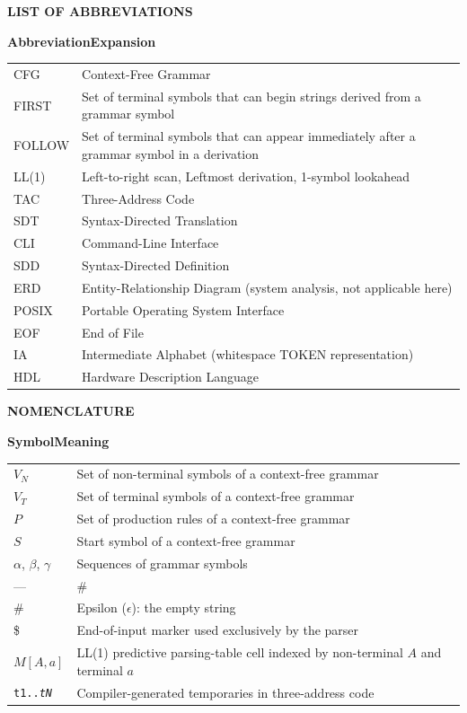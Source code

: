 \documentclass[12pt,a4paper,oneside,openany]{report}
\newcommand{\pmpage}[1]{%
  \clearpage\thispagestyle{fancy}%
  \begin{center}\bfseries\fontsize{14}{18}\selectfont #1\end{center}%
  \vspace{0.6em}}
\begin{document}
\pmpage{LIST OF ABBREVIATIONS}
{\bfseries\fontsize{12}{18}\selectfont Abbreviation\hfill Expansion\par}
\vspace{0.4em}\noindent
\begin{tabular}{@{}p{3.6cm}p{10.3cm}@{}}
CFG & Context-Free Grammar \\
FIRST & Set of terminal symbols that can begin strings derived from a grammar symbol \\
FOLLOW & Set of terminal symbols that can appear immediately after a grammar symbol in a derivation \\
LL(1) & Left-to-right scan, Leftmost derivation, 1-symbol lookahead \\
TAC & Three-Address Code \\
SDT & Syntax-Directed Translation \\
CLI & Command-Line Interface \\
SDD & Syntax-Directed Definition \\
ERD & Entity-Relationship Diagram (system analysis, not applicable here) \\
POSIX & Portable Operating System Interface \\
EOF & End of File \\
IA & Intermediate Alphabet (whitespace TOKEN representation) \\
HDL & Hardware Description Language \\
\end{tabular}

\pmpage{NOMENCLATURE}
{\bfseries\fontsize{12}{18}\selectfont Symbol\hfill Meaning\par}
\vspace{0.4em}\noindent
\begin{tabular}{@{}p{2.7cm}p{11.2cm}@{}}
$V_N$ & Set of non-terminal symbols of a context-free grammar \\
$V_T$ & Set of terminal symbols of a context-free grammar \\
$P$ & Set of production rules of a context-free grammar \\
$S$ & Start symbol of a context-free grammar \\
$\alpha$, $\beta$, $\gamma$ & Sequences of grammar symbols \\
--- & \# \\ 
\# & Epsilon ($\epsilon$): the empty string \\
\$ & End-of-input marker used exclusively by the parser \\
$M[A,a]$ & LL(1) predictive parsing-table cell indexed by non-terminal $A$ and terminal $a$ \\
\texttt{t1..\textit{tN}} & Compiler-generated temporaries in three-address code \\
\end{tabular}
\end{document}
